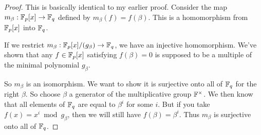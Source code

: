 \begin{proof}
  This is basically identical to my earlier proof. Consider the map
  $m_\beta: \mathbb{F}_p[x] \to \mathbb{F}_q$ defined by $m_\beta(f) = f(\beta)$. This
  is a homomorphism from $\mathbb{F}_p[x]$ into $\mathbb{F}_q$.

  If we restrict $m_\beta: \mathbb{F}_p[x]/(g_\beta) \to \mathbb{F}_q$, we have an
  injective homomorphism. We've shown that any $f \in \mathbb{F}_p[x]$
  satisfying $f(\beta) = 0$ is supposed to be a multiple of the minimal
  polynomial $g_\beta$.

  So $m_\beta$ is an isomorphism. We want to show it is surjective onto
  all of $\mathbb{F}_q$ for the right $\beta$. So choose $\beta$ a generator of
  the multiplicative group $\mathbb{F}^\times$. We then know that all elements
  of $\mathbb{F}_q$ are equal to $\beta^i$ for some $i$. But if you take $f(x) =
  x^i \bmod g_\beta$, then we will still have $f(\beta) = \beta^i$. Thus
  $m_\beta$ is surjective onto all of $\mathbb{F}_q$.
\end{proof}
